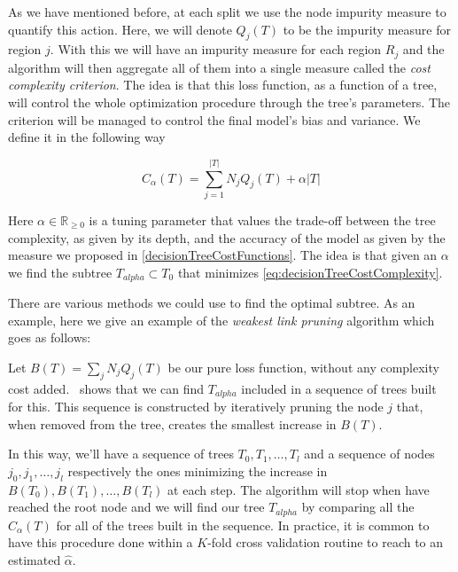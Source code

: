 As we have mentioned before, at each split we use the node impurity measure to quantify this action. Here, we will denote $Q_j(T)$ to be the impurity measure for region $j$. 
With this we will have an impurity measure for each region $R_j$ and the algorithm will then aggregate all of them into a single measure called the \textit{cost complexity criterion}. The idea is that this loss function, as a function of a tree, will control the whole optimization procedure through the tree's parameters. The criterion will be managed to control the final model's bias and variance. We define it in the following way

\begin{equation}
C_\alpha(T) = \sum_{j=1}^{|T|} N_j Q_j(T) + \alpha|T|
\end{equation}\label{eq:decisionTreeCostComplexity}


Here $\alpha \in \mathbb{R}_{\geq 0}$ is a tuning parameter that values the trade-off between the tree complexity, as given by its depth, and the accuracy of the model as given by the measure we proposed in \cref{decisionTreeCostFunctions}. The idea is that given an $\alpha$ we find the subtree $T_{alpha} \subset T_0$ that minimizes \cref{eq:decisionTreeCostComplexity}.

There are various methods we could use to find the optimal subtree. As an example, here we give an example of the \textit{weakest link pruning} algorithm which goes as follows:

Let $B(T) = \sum_{j} N_j Q_j(T) $ be our pure loss function, without any complexity cost added.~\cite{breiman-cart84} shows that we can find $T_{alpha}$ included in a sequence of trees built for this. This sequence is constructed by iteratively pruning the node $j$ that, when removed from the tree, creates the smallest increase in $B(T)$.


In this way, we'll have a sequence of trees $T_0,T_1,\ldots,T_l$ and a sequence of nodes $j_0, j_1,\ldots,j_l$ respectively the ones minimizing the increase in $B(T_0),B(T_1),\ldots,B(T_l)$ at each step. The algorithm will stop when have reached the root node and we will find our tree $T_{alpha}$ by comparing all the $C_\alpha(T)$ for all of the trees built in the sequence. In practice, it is common to have this procedure done within a $K$-fold cross validation routine to reach to an estimated $\hat{\alpha}$.

